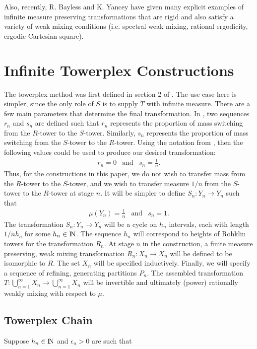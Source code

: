 \documentclass[12pt]{amsart}
\begin{document}
Also, recently, R. Bayless and K. Yancey \cite{BayYan14} have given 
many explicit examples of infinite measure preserving transformations 
that are rigid and also satisfy a variety of weak mixing conditions 
(i.e. spectral weak mixing, rational ergodicity, ergodic Cartesian square). 

\section{Infinite Towerplex Constructions}
The towerplex method was first defined in section 2 of \cite{Towerplex1}.  
The use case here is simpler, since the only role of $S$ is to supply $T$ with infinite measure. 
There are a few main parameters that determine the final transformation. 
In \cite{Towerplex1}, 
two sequences $r_n$ and $s_n$ are defined such that $r_n$ represents the proportion of mass 
switching from the $R$-tower to the $S$-tower. Similarly, $s_n$ represents the proportion of mass 
switching from the $S$-tower to the $R$-tower. Using the notation from \cite{Towerplex1}, 
then the following values could be used to produce our desired transformation: 
\begin{eqnarray}
r_n = 0 &\mbox{and}& s_n = \frac{1}{n} . 
\end{eqnarray} 
Thus, for the constructions in this paper, we do not wish to transfer mass from the $R$-tower 
to the $S$-tower, and we wish to transfer measure ${1} / {n}$ from the $S$-tower 
to the $R$-tower at stage $n$.  It will be simpler to define $S_n:Y_n\to Y_n$ such that 
\begin{eqnarray}
\mu (Y_n) = \frac{1}{n} &\mbox{and}& s_n = 1 .  
\end{eqnarray} 
The transformation $S_n:Y_n\to Y_n$ will 
be a cycle on $h_n$ intervals, each with length ${1} / {nh_n}$ for some $h_n \in {\hbox{\rm\setbox1=\hbox{I}\copy1\kern-.45\wd1 N}}$. 
The sequence $h_n$ will correspond to heights of Rohklin towers for the transformation $R_n$. 
At stage $n$ in the construction, a finite measure preserving, weak mixing transformation 
$R_n:X_n\to X_n$ will be defined to be isomorphic to $R$.  The set $X_n$ will be specified 
inductively. Finally, we will specify a sequence of refining, generating partitions $P_n$. 
The assembled transformation 
$T:\bigcup_{n=1}^{\infty}X_n \to \bigcup_{n=1}^{\infty}X_n$ will be invertible and 
ultimately (power) rationally weakly mixing with respect to $\mu$. 

\subsection{Towerplex Chain}
Suppose $h_n \in {\hbox{\rm\setbox1=\hbox{I}\copy1\kern-.45\wd1 N}}$ and $\epsilon_n >0$ are such that 
\end{document}
